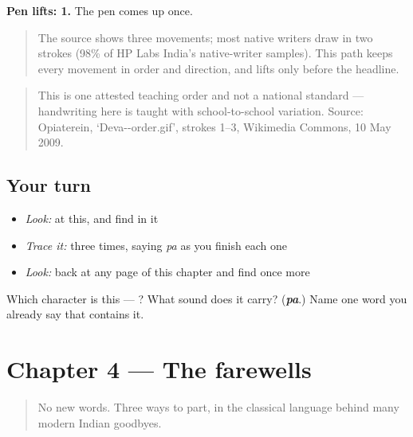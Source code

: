 \textbf{Pen lifts: 1.} The pen comes up once.

\begin{quote}
The source shows three movements; most native writers draw  in two strokes (98\% of HP Labs India's native-writer samples). This path keeps every movement in order and direction, and lifts only before the headline.
\end{quote}

\begin{quote}
This is one attested teaching order and not a national standard — handwriting here is taught with school-to-school variation. Source: Opiaterein, ‘Deva--order.gif’, strokes 1–3, Wikimedia Commons, 10 May 2009.
\end{quote}

\subsection*{Your turn}
\begin{itemize}
\raggedright
  \item \emph{Look:} at this, and find  in it
\end{itemize}

\begin{quote}
\end{quote}

\begin{itemize}
\raggedright
  \item \emph{Trace it:}  three times, saying \emph{pa} as you finish each one
  \item \emph{Look:} back at any page of this chapter and find  once more
\end{itemize}

\begin{tcolorbox}[breakable,colback=teal!4,colframe=teal!35!black,title={Before you move on}]
Which character is this — ? What sound does it carry? (\emph{\textbf{pa}}.) Name one word you already say that contains it.
\end{tcolorbox}
\section[Practice]{Chapter 4 — The farewells}

\label{lesson:SA-C04-practice}



\begin{quote}
No new words. Three ways to part, in the classical language behind many modern Indian goodbyes.
\end{quote}

